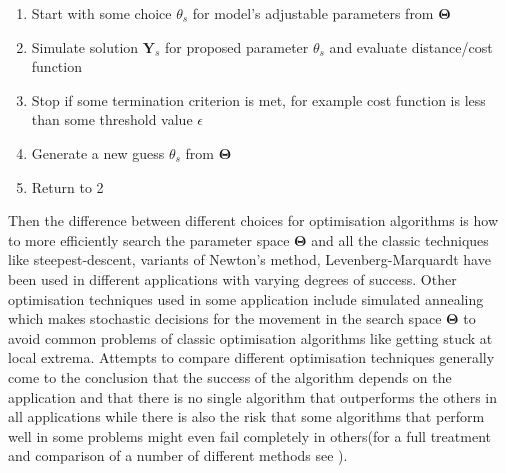\documentclass[12pt,a4paper,titlepage]{article}
\begin{document}
\begin{enumerate}[noitemsep]
\item{Start with some choice $\theta_{s}$ for model's adjustable parameters from $\mathbf{\Theta}$}
\item{Simulate solution $\mathbf{Y}_{s}$ for proposed parameter $\theta_{s}$ and evaluate distance/cost function}
\item{Stop if some termination criterion is met, for example cost function is less than some threshold value $\epsilon$}
\item{Generate a new guess $\theta_{s}$ from $\mathbf{\Theta}$}
\item{Return to 2}
\end{enumerate}
Then the difference between different choices for optimisation algorithms is how to more efficiently search the parameter space $\mathbf{\Theta}$ and all the classic techniques like steepest-descent, variants of Newton's method, Levenberg-Marquardt have been used in different applications with varying degrees of success\cite{mendes1998non}. Other optimisation techniques used in some application include simulated annealing\cite{kirkpatrick1983optimization} which makes stochastic decisions for the movement in the search space $\mathbf{\Theta}$ to avoid common problems of classic optimisation algorithms like getting stuck at local extrema. Attempts to compare different optimisation techniques generally come to the conclusion that the success of the algorithm depends on the application and that there is no single algorithm that outperforms the others in all applications while there is also the risk that some algorithms that perform well in some problems might even fail completely in others(for a full treatment and comparison of a number of different methods see \cite{mendes1998non}). 
\end{document}
